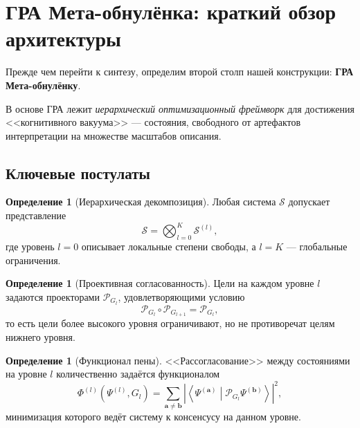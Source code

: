 \documentclass[12pt,a4paper]{article}
\theoremstyle{plain}
\theoremstyle{definition}
\newtheorem{definition}[theorem]{Определение}
\theoremstyle{remark}
\newcommand{\cP}{\mathcal{P}}
\newcommand{\cS}{\mathcal{S}}
\newcommand{\abs}[1]{\left|#1\right|}
\newcommand{\inner}[2]{\left\langle #1 \middle| #2 \right\rangle}
\begin{document}
\section{ГРА Мета-обнулёнка: краткий обзор архитектуры}
\label{sec:gra-primer}

Прежде чем перейти к синтезу, определим второй столп нашей конструкции: \textbf{ГРА Мета-обнулёнку}.

В основе ГРА лежит \emph{иерархический оптимизационный фреймворк} для достижения <<когнитивного вакуума>> --- состояния, свободного от артефактов интерпретации на множестве масштабов описания.

\subsection{Ключевые постулаты}

\begin{definition}[Иерархическая декомпозиция]
Любая система $\cS$ допускает представление
\begin{equation}
    \cS = \bigotimes_{l=0}^{K} \cS^{(l)},
    \label{eq:hier-decomp}
\end{equation}
где уровень $l=0$ описывает локальные степени свободы, а $l=K$ --- глобальные ограничения.
\end{definition}

\begin{definition}[Проективная согласованность]
Цели на каждом уровне $l$ задаются проекторами $\cP_{G_l}$, удовлетворяющими условию
\begin{equation}
    \cP_{G_l} \circ \cP_{G_{l+1}} = \cP_{G_l},
    \label{eq:proj-consistency}
\end{equation}
то есть цели более высокого уровня ограничивают, но не противоречат целям нижнего уровня.
\end{definition}

\begin{definition}[Функционал пены]
<<Рассогласование>> между состояниями на уровне $l$ количественно задаётся функционалом
\begin{equation}
    \Phi^{(l)}(\Psi^{(l)}, G_l) = \sum_{\mathbf{a} \neq \mathbf{b}} 
    \abs{\inner{\Psi^{(\mathbf{a})}}{\cP_{G_l} \Psi^{(\mathbf{b})}}}^2,
    \label{eq:foam-functional}
\end{equation}
минимизация которого ведёт систему к консенсусу на данном уровне.
\end{definition}
\end{document}
